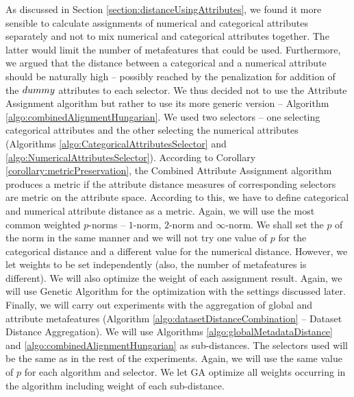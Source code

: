 As discussed in Section \ref{section:distanceUsingAttributes}, we found it more sensible to calculate assignments of numerical and categorical attributes separately and not to mix numerical and categorical attributes together. The latter would limit the number of metafeatures that could be used. Furthermore, we argued that the distance between a categorical and a numerical attribute should be naturally high -- possibly reached by the penalization for addition of the $dummy$ attributes to each selector. We thus decided not to use the Attribute Assignment algorithm but rather to use its more generic version -- Algorithm \ref{algo:combinedAlignmentHungarian}. We used two selectors -- one selecting categorical attributes and the other selecting the numerical attributes (Algorithms \ref{algo:CategoricalAttributesSelector} and \ref{algo:NumericalAttributesSelector}). According to Corollary \ref{corollary:metricPreservation}, the Combined Attribute Assignment algorithm produces a metric if the attribute distance measures of corresponding selectors are metric on the attribute space. According to this, we have to define categorical and numerical attribute distance as a metric. Again, we will use the most common weighted $p$-norms -- $1$-norm, $2$-norm and $\infty$-norm.  We shall set the $p$ of the norm in the same manner and we will not try one value of $p$ for the categorical distance and a different value for the numerical distance. However, we let weights to be set independently (also, the number of metafeatures is different). We will also optimize the weight of each assignment result. Again, we will use Genetic Algorithm for the optimization with the settings discussed later. Finally, we will carry out experiments with the aggregation of global and attribute metafeatures (Algorithm \ref{algo:datasetDistanceCombination} -- Dataset Distance Aggregation). We will use Algorithms \ref{algo:globalMetadataDistance} and \ref{algo:combinedAlignmentHungarian} as sub-distances. The selectors used will be the same as in the rest of the experiments. Again, we will use the same value of $p$ for each algorithm and selector. We let GA optimize all weights occurring in the algorithm including weight of each sub-distance.

